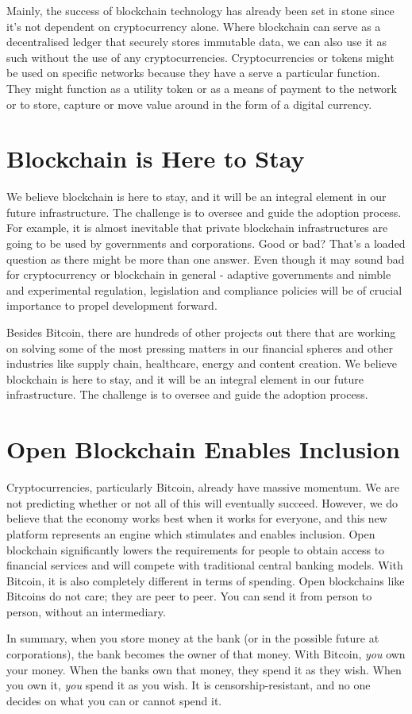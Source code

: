 Mainly, the success of blockchain technology has already been set in stone since it's not dependent on cryptocurrency alone. Where blockchain can serve as a decentralised ledger that securely stores immutable data, we can also use it as such without the use of any cryptocurrencies. Cryptocurrencies or tokens might be used on specific networks because they have a serve a particular function. They might function as a utility token or as a means of payment to the network or to store, capture or move value around in the form of a digital currency.\medskip


\section{Blockchain is Here to Stay}
We believe blockchain is here to stay, and it will be an integral element in our future infrastructure. The challenge is to oversee and guide the adoption process. For example, it is almost inevitable that private blockchain infrastructures are going to be used by governments and corporations. Good or bad? That's a loaded question as there might be more than one answer. Even though it may sound bad for cryptocurrency or blockchain in general - adaptive governments and nimble and experimental regulation, legislation and compliance policies will be of crucial importance to propel development forward. 

Besides Bitcoin, there are hundreds of other projects out there that are working on solving some of the most pressing matters in our financial spheres and other industries like supply chain, healthcare, energy and content creation. We believe blockchain is here to stay, and it will be an integral element in our future infrastructure.  The challenge is to oversee and guide the adoption process.

\section{Open Blockchain Enables Inclusion}
Cryptocurrencies, particularly Bitcoin, already have massive momentum. We are not predicting whether or not all of this will eventually succeed. However, we do believe that the economy works best when it works for everyone, and this new platform represents an engine which stimulates and enables inclusion. Open blockchain significantly lowers the requirements for people to obtain access to financial services and will compete with traditional central banking models. With Bitcoin, it is also completely different in terms of spending. Open blockchains like Bitcoins do not care; they are peer to peer. You can send it from person to person, without an intermediary. 

In summary, when you store money at the bank (or in the possible future at corporations), the bank becomes the owner of that money. With Bitcoin, \emph{you} own your money. When the banks own that money, they spend it as they wish. When you own it, \emph{you} spend it as you wish. It is censorship-resistant, and no one decides on what you can or cannot spend it.\medskip 

